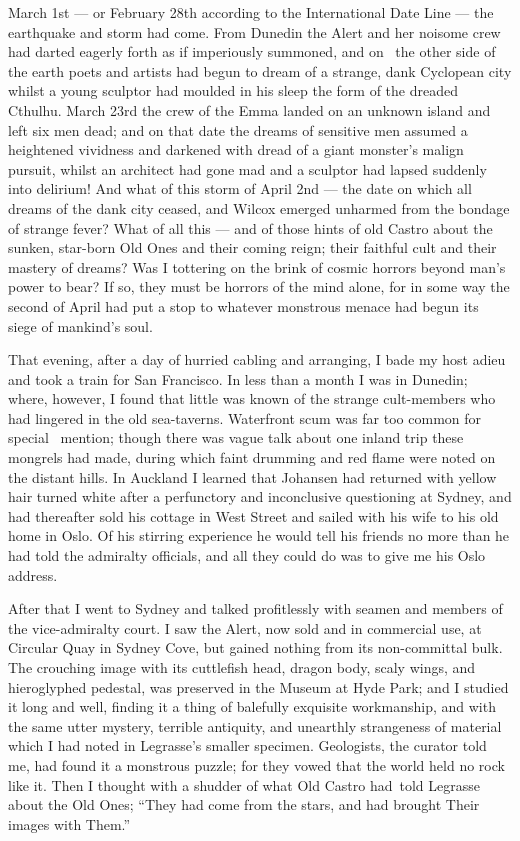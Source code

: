 March 1st --- or February 28th according to the International Date Line ---
the earthquake and storm had come. From Dunedin the Alert and her
noisome crew had darted eagerly forth as if imperiously summoned, and on
\est\ the other side of the earth poets and artists had begun to dream of a
strange, dank Cyclopean city whilst a young sculptor had moulded in his
sleep the form of the dreaded Cthulhu. March 23rd the crew of the Emma
landed on an unknown island and left six men dead; and on that date the
dreams of sensitive men assumed a heightened vividness and darkened with
dread of a giant monster's malign pursuit, whilst an architect had gone
mad and a sculptor had lapsed suddenly into delirium! And what of this
storm of April 2nd --- the date on which all dreams of the dank city
ceased, and Wilcox emerged unharmed from the bondage of strange fever?
What of all this --- and of those hints of old Castro about the sunken,
star-born Old Ones and their coming reign; their faithful cult and their
mastery of dreams? Was I tottering on the brink of cosmic horrors beyond
man's power to bear? If so, they must be horrors of the mind alone, for
in some way the second of April had put a stop to whatever monstrous
menace had begun its siege of mankind's soul.

That evening, after a day of hurried cabling and arranging, I bade my
host adieu and took a train for San Francisco. In less than a month I
was in Dunedin; where, however, I found that little was known of the
strange cult-members who had lingered in the old sea-taverns. Waterfront
scum was far too common for special \est\ mention; though there was vague talk
about one inland trip these mongrels had made, during which faint
drumming and red flame were noted on the distant hills. In Auckland I
learned that Johansen had returned with yellow hair turned white after a
perfunctory and inconclusive questioning at Sydney, and had thereafter
sold his cottage in West Street and sailed with his wife to his old home
in Oslo. Of his stirring experience he would tell his friends no more
than he had told the admiralty officials, and all they could do was to
give me his Oslo address.

After that I went to Sydney and talked profitlessly with seamen and
members of the vice-admiralty court. I saw the Alert, now sold and in
commercial use, at Circular Quay in Sydney Cove, but gained nothing from
its non-committal bulk. The crouching image with its cuttlefish head,
dragon body, scaly wings, and hieroglyphed pedestal, was preserved in
the Museum at Hyde Park; and I studied it long and well, finding it a
thing of balefully exquisite workmanship, and with the same utter
mystery, terrible antiquity, and unearthly strangeness of material which
I had noted in Legrasse's smaller specimen. Geologists, the curator told
me, had found it a monstrous puzzle; for they vowed that the world held
no rock like it. Then I thought with a shudder of what Old Castro had\est\
 told Legrasse about the Old Ones; ``They had come from the stars, and
had brought Their images with Them.''

